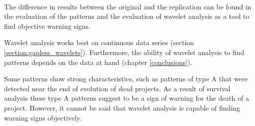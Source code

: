\paragraph{}
The difference in results between the original and the replication can be found
in the evaluation of the patterns and the evaluation of wavelet analysis as a
tool to find objective warning signs.

Wavelet analysis works best on continuous data series (section
\ref{section:gapless_wavelets}). Furthermore, the ability of wavelet analysis
to find patterns depends on the data at hand (chapter \ref{conclusions}).

Some patterns show strong characteristics, such as patterns of type A that were
detected near the end of evolution of dead projects. As a result of survival
analysis these type A patterns suggest to be a sign of warning for the death
of a project. However, it cannot be said that wavelet analysis is capable
of finding warning signs objectively.

\begin{comment}
About original study:
- research questions
- participants
- design
- artifacts
- context variables
- summary of results

About replication:
- motivation
- level of interaction with original researchers
- changes to the original experiment

Comparison of results:
- consistent results
- differences in results

Conclude across studies.

\end{comment}